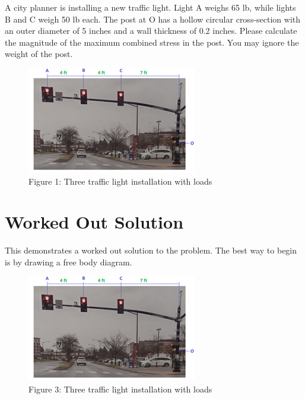 \documentclass[
  letterpaper,
  DIV=11,
  numbers=noendperiod]{scrreprt}
\begin{document}

A city planner is installing a new traffic light. Light A weighs 65 lb,
while lights B and C weigh 50 lb each. The post at O has a hollow
circular cross-section with an outer diameter of 5 inches and a wall
thickness of 0.2 inches. Please calculate the magnitude of the maximum
combined stress in the post. You may ignore the weight of the post.

\begin{figure}[H]

{\centering \includegraphics{images/stoplights.png}

}

\caption{Figure 1: Three traffic light installation with loads}

\end{figure}%

\section*{Worked Out Solution}\label{worked-out-solution}


This demonstrates a worked out solution to the problem. The best way to
begin is by drawing a free body diagram.

\begin{figure}[H]

{\centering \includegraphics{images/stoplights.png}

}

\caption{Figure 3: Three traffic light installation with loads}

\end{figure}%
\end{document}
